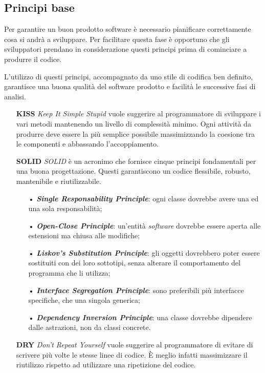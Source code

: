 \subsection{Principi base}
Per garantire un buon prodotto software è necessario pianificare correttamente cosa si andrà a sviluppare. Per facilitare questa fase è opportuno che gli sviluppatori prendano in considerazione questi principi prima di cominciare a produrre il codice. 

L'utilizzo di questi principi, accompagnato da uno stile di codifica ben definito, garantisce una buona qualità del software prodotto e facilità le successive fasi di analisi.

\begin{itemize}
\item[] \textbf{KISS} \textit{Keep It Simple Stupid} vuole suggerire al programmatore di sviluppare i vari metodi mantenendo un livello di complessità minimo. Ogni attività da produrre deve essere la più semplice possibile massimizzando la coesione tra le componenti e abbassando l'accoppiamento.

\item[] \textbf{SOLID} \textit{SOLID} è un acronimo che fornisce cinque principi fondamentali per una buona progettazione. Questi garantiscono un codice flessibile, robusto, mantenibile e riutilizzabile.
\begin{itemize}
\item[•] \textbf{\textit{Single Responsability Principle}}: ogni classe dovrebbe avere una ed una sola responsabilità;

\item[•] \textbf{\textit{Open-Close Principle}}: un'entità \textit{software} dovrebbe essere aperta alle estensioni ma chiusa alle modifiche;

\item[•] \textbf{\textit{Liskov's Substitution Principle}}: gli oggetti dovrebbero poter essere sostituiti con dei loro sottotipi, senza alterare il comportamento del programma che li utilizza;

\item[•] \textbf{\textit{Interface Segregation Principle}}: sono preferibili più interfacce specifiche, che una singola generica;

\item[•] \textbf{\textit{Dependency Inversion Principle}}: una classe dovrebbe dipendere dalle astrazioni, non da classi concrete.
\end{itemize}

\item[] \textbf{DRY} \textit{Don't Repeat Yourself} vuole suggerire al programmatore di evitare di scrivere più volte le stesse linee di codice. È meglio infatti massimizzare il riutilizzo rispetto ad utilizzare una ripetizione del codice.
\end{itemize}

